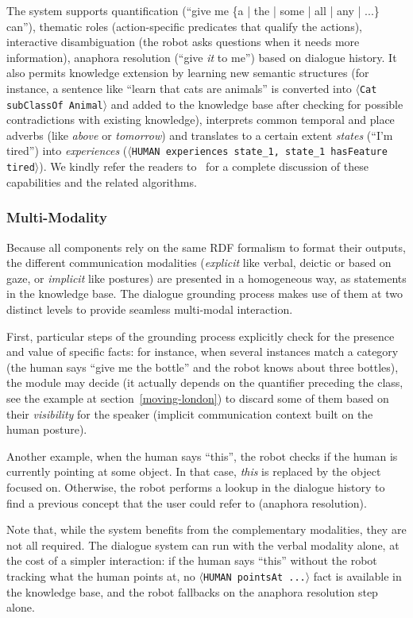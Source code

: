 \documentclass[preprint,3p,times]{elsarticle}
\newcommand{\stmt}[1]{{\footnotesize\tt$\langle$#1\relax$\rangle$}}
\begin{document}
The system supports quantification (``give me \{a | the | some | all | any |
...\} can''), thematic roles (action-specific predicates that qualify the
actions), interactive disambiguation (the robot asks questions when it needs
more information), anaphora resolution (``give \emph{it} to me'') based on
dialogue history. It also permits knowledge extension by learning new semantic
structures (for instance, a sentence like ``learn that cats are animals'' is
converted into \stmt{Cat subClassOf Animal} and added to the knowledge base
after checking for possible contradictions with existing knowledge),
interprets common temporal and place adverbs (like \emph{above} or
\emph{tomorrow}) and translates to a certain extent \emph{states} (``I'm
tired'') into \emph{experiences} (\stmt{HUMAN experiences state\_1, state\_1
hasFeature tired}). We kindly refer the readers to~\cite{Lemaignan2011a} for a
complete discussion of these capabilities and the related algorithms.

\subsubsection{Multi-Modality}

Because all components rely on the same RDF formalism to format their outputs,
the different communication modalities (\emph{explicit} like verbal, deictic or
based on gaze, or \emph{implicit} like postures) are presented in a homogeneous
way, as statements in the knowledge base. The dialogue grounding process makes
use of them at two distinct levels to provide seamless multi-modal interaction.

First, particular steps of the grounding process explicitly check for the
presence and value of specific facts: for instance, when several instances match
a category (the human says ``give me the bottle'' and the robot knows about
three bottles), the module may decide (it actually depends on the quantifier
preceding the class, see the example at section~\ref{moving-london}) to discard
some of them based on their \emph{visibility} for the speaker (implicit
communication context built on the human posture).

Another example, when the human says ``this'', the robot checks if the human is
currently pointing at some object. In that case, \emph{this} is replaced by the
object focused on. Otherwise, the robot performs a lookup in the dialogue history
to find a previous concept that the user could refer to (anaphora resolution).

Note that, while the system benefits from the complementary modalities, they are
not all required. The dialogue system can run with the verbal modality alone, at
the cost of a simpler interaction: if the human says ``this'' without the robot
tracking what the human points at, no \stmt{HUMAN pointsAt ...} fact is
available in the knowledge base, and the robot fallbacks on the anaphora
resolution step alone.
\end{document}
